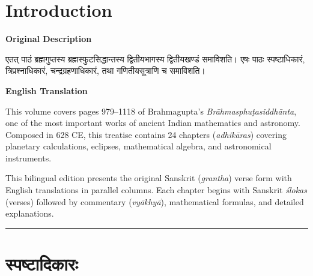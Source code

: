 \documentclass[11pt,a4paper]{article}
\newcommand{\longline}{\noindent\rule{\textwidth}{0.4pt}}
\newcommand{\dev}[1]{{\devanagarifont #1}}
\begin{document}
\tableofcontents
\newpage

\section*{Introduction}

\begin{minipage}[t]{0.48\textwidth}
\textbf{\small Original Description}

{\small\devanagarifont एतत् पाठं ब्रह्मगुप्तस्य ब्रह्मस्फुटसिद्धान्तस्य द्वितीयभागस्य द्वितीयखण्डं समाविशति। एषः पाठः स्पष्टाधिकारं, त्रिप्रश्नाधिकारं, चन्द्रग्रहणाधिकारं, तथा गणितीयसूत्राणि च समाविशति।}
\end{minipage}%
\hfill
\begin{minipage}[t]{0.48\textwidth}
\textbf{\small English Translation}

This volume covers pages 979--1118 of Brahmagupta's \textit{Br\=ahmasphu\d{t}asiddh\=anta}, one of the most important works of ancient Indian mathematics and astronomy. Composed in 628 CE, this treatise contains 24 chapters (\textit{adhik\=aras}) covering planetary calculations, eclipses, mathematical algebra, and astronomical instruments.

This bilingual edition presents the original Sanskrit (\textit{grantha}) verse form with English translations in parallel columns. Each chapter begins with Sanskrit \textit{\'slokas} (verses) followed by commentary (\textit{vy\=akhy\=a}), mathematical formulas, and detailed explanations.
\end{minipage}

\vspace{0.5em}
\longline


\section{\dev{स्पष्टादिकारः}}
\end{document}

